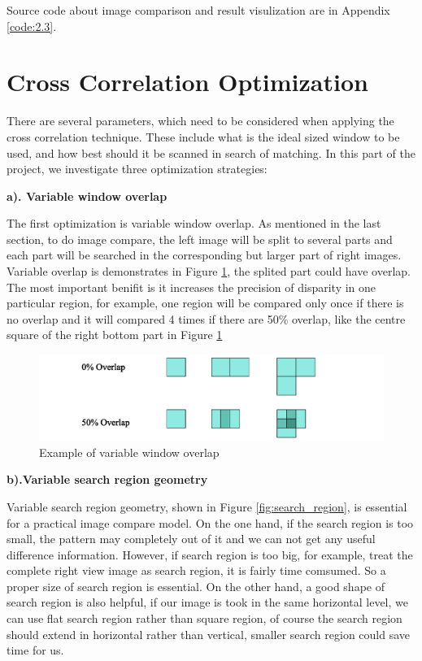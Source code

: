 Source code about image comparison and result visulization are in Appendix \ref{code:2.3}.

\section{Cross Correlation Optimization}

There are several parameters, which need to be considered when applying the cross correlation technique. These include what is the ideal sized window to be used, and how best should it be scanned in search of matching. In this part of the project, we investigate three optimization strategies:

\textbf{a). Variable window overlap}

The first optimization is variable window overlap. As mentioned in the last section, to do image compare, the left image will be split to several parts and each part will be searched in the corresponding but larger part of right images. Variable overlap is demonstrates in Figure \ref{fig:window_overlap}, the splited part could have overlap. The most important benifit is it increases the precision of disparity in one particular region, for example, one region will be compared only once if there is no overlap and it will compared 4 times if there are 50\% overlap, like the centre square of the right bottom part in  Figure \ref{fig:window_overlap}

\begin{figure}[h!]
	\centering
	\includegraphics[width=0.8\linewidth]{figures/part2/window_overlap}
	\caption{Example of variable window overlap}
	\label{fig:window_overlap}
\end{figure}

\textbf{b).Variable search region geometry}

Variable search region geometry, shown in Figure \ref{fig:search_region}, is essential for a practical image compare model. On the one hand, if the search region is too small, the pattern may completely out of it and we can not get any useful difference information. However, if search region is too big, for example, treat the complete right view image as search region, it is fairly time comsumed. So a proper size of search region is essential. On the other hand, a good shape of search region is also helpful, if our image is took in the same horizontal level, we can use flat search region rather than square region, of course the search region should extend in horizontal rather than vertical, smaller search region could save time for us.

